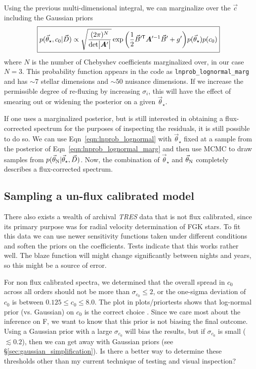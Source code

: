 \documentclass[preprint]{aastex} %
\newcommand{\vt}{\vec{\theta}}
\newcommand{\vstar}{\vt_{\star}}
\newcommand{\vN}{\vt_{\rm N}}
\newcommand{\vc}{\vec{c}}
\newcommand{\vD}{\vec{D}}
\newcommand{\trans}{\mathsf{T}}
\begin{document}
Using the previous multi-dimensional integral, we can marginalize over the $\vc$ including the Gaussian priors
\begin{equation}
  \boxed{
  p(\vstar, c_0 | \vD) \propto \sqrt{\frac{(2 \pi )^N}{ {\rm det} \bigl |{\bm A}^\prime \bigr |}} \exp{ \left ( \frac{1}{2} \vec{B}^{\prime\trans} {\bm A}^{\prime -1} \vec{B}^\prime + g^\prime \right )} p(\vstar) p(c_0)
}
\label{eqn:lnprob_lognormal_marg}
\end{equation}
where $N$ is the number of Chebyshev coefficients marginalized over, in our case $N=3$. This probability function appears in the code as \texttt{lnprob\_lognormal\_marg} and has $\sim 7$ stellar dimensions and $\sim 50$ nuisance dimensions. If we increase the permissible degree of re-fluxing by increasing $\sigma_i$, this will have the effect of smearing out or widening the posterior on a given $\vstar$.

If one uses a marginalized posterior, but is still interested in obtaining a flux-corrected spectrum for the purposes of inspecting the residuals, it is still possible to do so. We can use Eqn~\ref{eqn:lnprob_lognormal} with $\vstar$ fixed at a sample from the posterior of Eqn~\ref{eqn:lnprob_lognormal_marg} and then use MCMC to draw samples from $p(\vN | \vstar, \vD)$. Now, the combination of $\vstar$ and $\vN$ completely describes a flux-corrected spectrum.

\subsection{Sampling a un-flux calibrated model}
There also exists a wealth of archival \emph{TRES} data that is not flux calibrated, since its primary purpose was for radial velocity determination of FGK stars. To fit this data we can use newer sensitivity functions taken under different conditions and soften the priors on the coefficients. Tests indicate that this works rather well. The blaze function will might change significantly between nights and years, so this might be a source of error.

For non flux calibrated spectra, we determined that the overall spread in $c_0$ across all orders should not be more than $\sigma_{c_0} \leq 2$, or the one-sigma deviation of $c_0$ is between $0.125 \leq c_0 \leq 8.0$. The plot in plots/priortests shows that log-normal prior (vs. Gaussian) on $c_0$ is the correct choice . Since we care most about the inference on F, we want to know that this prior is not biasing the final outcome. Using a Gaussian prior with a large $\sigma_{c_0}$ will bias the results, but if $\sigma_{c_0}$ is small ($\lesssim 0.2$), then we can get away with Gaussian priors (see \S\ref{sec:gaussian_simplification}). Is there a better way to determine these thresholds other than my current technique of testing and visual inspection?
 
\end{document}

